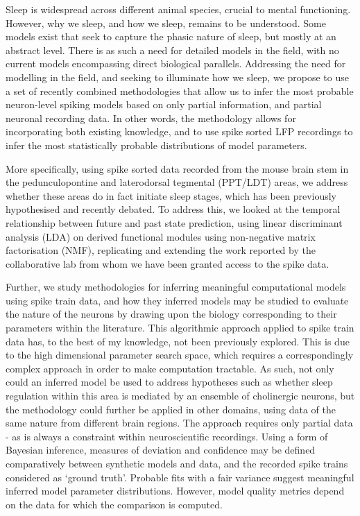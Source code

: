 \documentclass[mphil,deptreport,ai]{infthesis} %
\begin{document}
Sleep is widespread across different animal species, crucial to mental functioning. However, why we sleep, and how we sleep, remains to be understood. Some models exist that seek to capture the phasic nature of sleep, but mostly at an abstract level. There is as such a need for detailed models in the field, with no current models encompassing direct biological parallels. Addressing the need for modelling in the field, and seeking to illuminate how we sleep, we propose to use a set of recently combined methodologies that allow us to infer the most probable neuron-level spiking models based on only partial information, and partial neuronal recording data. In other words, the methodology allows for incorporating both existing knowledge, and to use spike sorted LFP recordings to infer the most statistically probable distributions of model parameters.

More specifically, using spike sorted data recorded from the mouse brain stem in the pedunculopontine and laterodorsal tegmental (PPT/LDT) areas, we address whether these areas do in fact initiate sleep stages, which has been previously hypothesised and recently debated. 
To address this, we looked at the temporal relationship between future and past state prediction, using linear discriminant analysis (LDA) on derived functional modules using non-negative matrix factorisation (NMF), replicating and extending the work reported by the collaborative lab from whom we have been granted access to the spike data.

Further, we study methodologies for inferring meaningful computational models using spike train data, and how they inferred models may be studied to evaluate the nature of the neurons by drawing upon the biology corresponding to their parameters within the literature.
This algorithmic approach applied to spike train data has, to the best of my knowledge, not been previously explored. This is due to the high dimensional parameter search space, which requires a correspondingly complex approach in order to make computation tractable.
As such, not only could an inferred model be used to address hypotheses such as whether sleep regulation within this area is mediated by an ensemble of cholinergic neurons, but the methodology could further be applied in other domains, using data of the same nature from different brain regions.
The approach requires only partial data - as is always a constraint within neuroscientific recordings. Using a form of Bayesian inference, measures of deviation and confidence may be defined comparatively between synthetic models and data, and the recorded spike trains considered as ‘ground truth’. Probable fits with a fair variance suggest meaningful inferred model parameter distributions. However, model quality metrics depend on the data for which the comparison is computed.
\end{document}
